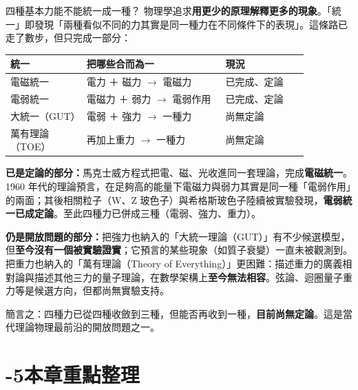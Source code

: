 \documentclass[11pt]{article}
\begin{document}
\begin{延伸框}{四種基本力能不能統一成一種？}
物理學追求\textbf{用更少的原理解釋更多的現象}。「統一」即發現「兩種看似不同的力其實是同一種力在不同條件下的表現」。這條路已走了數步，但只完成一部分：

\begin{center}
\renewcommand{\arraystretch}{1.3}
\begin{tabular}{p{0.22\linewidth} p{0.40\linewidth} p{0.24\linewidth}}
\hline
\textbf{統一} & \textbf{把哪些合而為一} & \textbf{現況} \\
\hline
電磁統一 & 電力 ＋ 磁力 $\rightarrow$ 電磁力 & 已完成、定論 \\
電弱統一 & 電磁力 ＋ 弱力 $\rightarrow$ 電弱作用 & 已完成、定論 \\
大統一（GUT） & 電弱 ＋ 強力 $\rightarrow$ 一種力 & 尚無定論 \\
萬有理論（TOE） & 再加上重力 $\rightarrow$ 一種力 & 尚無定論 \\
\hline
\end{tabular}
\end{center}

\textbf{已是定論的部分：}馬克士威方程式把電、磁、光收進同一套理論，完成\textbf{電磁統一}。1960 年代的理論預言，在足夠高的能量下電磁力與弱力其實是同一種「電弱作用」的兩面；其後相關粒子（W、Z 玻色子）與希格斯玻色子陸續被實驗發現，\textbf{電弱統一已成定論}。至此四種力已併成三種（電弱、強力、重力）。

\textbf{仍是開放問題的部分：}把強力也納入的「大統一理論（GUT）」有不少候選模型，但\textbf{至今沒有一個被實驗證實}；它預言的某些現象（如質子衰變）一直未被觀測到。把重力也納入的「萬有理論（Theory of Everything）」更困難：描述重力的廣義相對論與描述其他三力的量子理論，在數學架構上\textbf{至今無法相容}。弦論、迴圈量子重力等是候選方向，但都尚無實驗支持。

簡言之：四種力已從四種收斂到三種，但能否再收到一種，\textbf{目前尚無定論}。這是當代理論物理最前沿的開放問題之一。
\end{延伸框}

\section*{-5\quad 本章重點整理}
\end{document}
